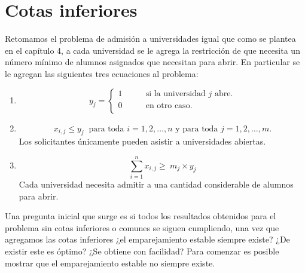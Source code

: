 \chapter{Cotas inferiores}

Retomamos el problema de admisión a universidades igual que como se plantea en el capítulo 4, a cada universidad se le agrega la restricción de que necesita un número mínimo de alumnos asignados que necesitan para abrir. En particular se le agregan las siguientes tres ecuaciones al problema:

\begin{enumerate}
\item \begin{equation} y_{j}= 
\begin{cases}
1 & \qquad \text{si la universidad $j$ abre.} \\
0 &\qquad\text{en otro caso.} \\ 
\end{cases} \end{equation} 
\item \begin{equation} \label{r6}
x_{i,j} \leq y_j \ \text{ para toda $i=1,2,\ldots,n$ y para toda $j=1,2,\ldots,m$.}
\end{equation}
Los solicitantes únicamente pueden asistir a universidades abiertas.
\item \begin{equation} \label{r4}
\sum_{i=1}^{n} x_{i,j} \geq\ m_j\times y_j 
\end{equation}
Cada universidad necesita admitir a una cantidad considerable de alumnos para abrir.
\end{enumerate}

Una pregunta inicial que surge es si todos los resultados obtenidos para el problema sin cotas inferiores o comunes se siguen cumpliendo, una vez que agregamos las cotas inferiores ¿el emparejamiento estable siempre existe? ¿De existir este es óptimo? ¿Se obtiene con facilidad? Para comenzar es posible mostrar que el emparejamiento estable no siempre existe.

